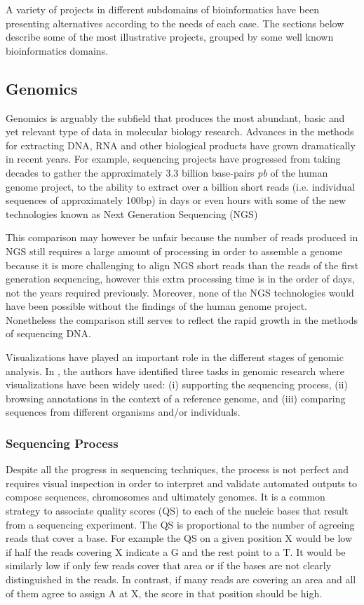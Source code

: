 A variety of projects in different subdomains of bioinformatics have been presenting alternatives according to the needs of each case. The sections below describe some of the most illustrative projects, grouped by some well known bioinformatics domains.

\subsection{Genomics}
Genomics is arguably the subfield that produces the most abundant, basic and yet relevant type of data in molecular biology research. Advances in the methods for extracting DNA, RNA and other biological products have grown dramatically in recent years. For example, sequencing projects have progressed from taking decades to gather the approximately 3.3 billion base-pairs \emph{pb} of the human genome project, to the ability to extract over a billion short reads (i.e. individual sequences of approximately 100bp) in days or even hours with some of the new technologies known as Next Generation Sequencing (NGS)

This comparison may however be unfair because the number of reads produced in NGS still requires a large amount of processing in order to assemble a genome because it is more challenging to align NGS short reads than the reads of the first generation sequencing, however this extra processing time is in the order of days, not the years required previously. Moreover, none of the NGS technologies would have been possible without the findings of the human genome project. Nonetheless the comparison still serves to reflect the rapid growth in the methods of sequencing DNA.

Visualizations have played an important role in the different stages of genomic analysis. In \cite{NIE2010}, the authors have identified three tasks in genomic research where visualizations have been widely used: (i) supporting the sequencing process, (ii) browsing annotations in the context of a reference genome, and (iii) comparing sequences from different organisms and/or individuals.

\subsubsection{Sequencing Process}
Despite all the progress in sequencing techniques, the process is not perfect and requires visual inspection in order to interpret and validate automated outputs to compose sequences, chromosomes and ultimately genomes. It is a common strategy to associate quality scores (QS) to each of the nucleic bases that result from a sequencing experiment. The QS is proportional to the number of agreeing reads that cover a base. For example the QS on a given position X would be low if half the reads covering X indicate a G and the rest point to a T. It would be similarly low if only few reads cover that area or if the bases are not clearly distinguished in the reads. In contrast, if many reads are covering an area and all of them agree to assign A at X, the score in that position should be high.

